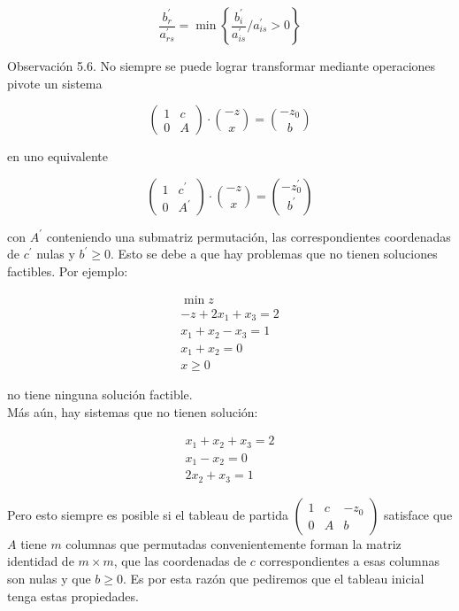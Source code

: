 \documentclass[10pt]{article}
\begin{document}
$$
\frac{b_{r}^{\prime}}{a_{r s}^{\prime}}=\min \left\{\frac{b_{i}^{\prime}}{a_{i s}^{\prime}} / a_{i s}^{\prime}>0\right\}
$$

Observación 5.6. No siempre se puede lograr transformar mediante operaciones pivote un sistema

$$
\left(\begin{array}{cc}
1 & c \\
0 & A
\end{array}\right) \cdot\binom{-z}{x}=\binom{-z_{0}}{b}
$$

en uno equivalente

$$
\left(\begin{array}{cc}
1 & c^{\prime} \\
0 & A^{\prime}
\end{array}\right) \cdot\binom{-z}{x}=\binom{-z_{0}^{\prime}}{b^{\prime}}
$$

con $A^{\prime}$ conteniendo una submatriz permutación, las correspondientes coordenadas de $c^{\prime}$ nulas y $b^{\prime} \geq 0$. Esto se debe a que hay problemas que no tienen soluciones factibles. Por ejemplo:

$$
\begin{gathered}
\min z \\
-z+2 x_{1}+x_{3}=2 \\
x_{1}+x_{2}-x_{3}=1 \\
x_{1}+x_{2}=0 \\
x \geq 0
\end{gathered}
$$

no tiene ninguna solución factible.\\
Más aún, hay sistemas que no tienen solución:

$$
\begin{array}{r}
x_{1}+x_{2}+x_{3}=2 \\
x_{1}-x_{2}=0 \\
2 x_{2}+x_{3}=1
\end{array}
$$

Pero esto siempre es posible si el tableau de partida $\left(\begin{array}{cc|c}1 & c & -z_{0} \\ 0 & A & b\end{array}\right)$ satisface que $A$ tiene $m$ columnas que permutadas convenientemente forman la matriz identidad de $m \times m$, que las coordenadas de $c$ correspondientes a esas columnas son nulas y que $b \geq 0$. Es por esta razón que pediremos que el tableau inicial tenga estas propiedades.
\end{document}
